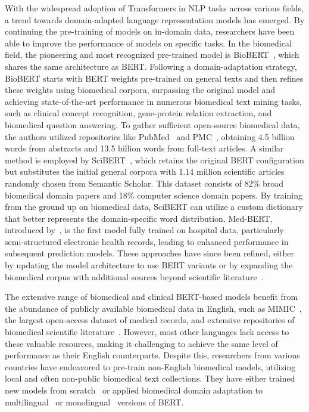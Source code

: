 With the widespread adoption of Transformers in NLP tasks across various fields,
a trend towards domain-adapted language representation models has emerged. By
continuing the pre-training of models on in-domain data, researchers have been
able to improve the performance of models on specific tasks. In the biomedical
field, the pioneering and most recognized pre-trained model is
BioBERT~\cite{lee2020biobert}, which shares the same architecture as BERT.
Following a domain-adaptation strategy, BioBERT starts with BERT weights
pre-trained on general texts and then refines these weights using biomedical
corpora, surpassing the original model and achieving state-of-the-art
performance in numerous biomedical text mining tasks, such as clinical concept
recognition, gene-protein relation extraction, and biomedical question
answering. To gather sufficient open-source biomedical data, the authors
utilized repositories like PubMed~\cite{white2020pubmed} and PMC~\cite{pmcoa},
obtaining 4.5 billion words from abstracts and 13.5 billion words from full-text
articles. A similar method is employed by SciBERT~\cite{beltagy2019scibert},
which retains the original BERT configuration but substitutes the initial
general corpora with 1.14 million scientific articles randomly chosen from
Semantic Scholar. This dataset consists of 82\% broad biomedical domain papers
and 18\% computer science domain papers. By training from the ground up on
biomedical data, SciBERT can utilize a custom dictionary that better represents
the domain-specific word distribution. Med-BERT, introduced
by~\cite{liu2021med}, is the first model fully trained on hospital data,
particularly semi-structured electronic health records, leading to enhanced
performance in subsequent prediction models. These approaches have since been
refined, either by updating the model architecture to use BERT variants or by
expanding the biomedical corpus with additional sources beyond scientific
literature~\cite{huang2019clinicalbert, peng2019transfer}.

The extensive range of biomedical and clinical BERT-based models benefit from
the abundance of publicly available biomedical data in English, such as
MIMIC~\cite{johnson2023mimic,johnson2023mimicnote}, the largest open-access
dataset of medical records, and extensive repositories of biomedical scientific
literature~\cite{white2020pubmed}. However, most other languages lack access to
these valuable resources, making it challenging to achieve the same level of
performance as their English counterparts. Despite this, researchers from
various countries have endeavored to pre-train non-English biomedical models,
utilizing local and often non-public biomedical text collections. They have
either trained new models from scratch~\cite{akhtyamova2020named} or applied
biomedical domain adaptation to multilingual~\cite{rubel2020biobertpt} or
monolingual~\cite{copara2020contextualized} versions of BERT.

